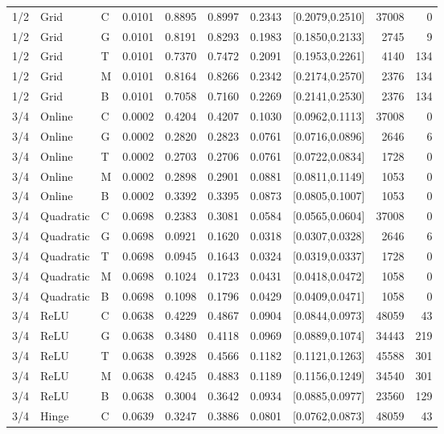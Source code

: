 \begin{longtable}{lllrrrrlrr}
1/2 & Grid & C & 0.0101 & 0.8895 & 0.8997 & 0.2343 & [0.2079,0.2510] & 37008 & 0 \\
1/2 & Grid & G & 0.0101 & 0.8191 & 0.8293 & 0.1983 & [0.1850,0.2133] & 2745 & 9 \\
1/2 & Grid & T & 0.0101 & 0.7370 & 0.7472 & 0.2091 & [0.1953,0.2261] & 4140 & 134 \\
1/2 & Grid & M & 0.0101 & 0.8164 & 0.8266 & 0.2342 & [0.2174,0.2570] & 2376 & 134 \\
1/2 & Grid & B & 0.0101 & 0.7058 & 0.7160 & 0.2269 & [0.2141,0.2530] & 2376 & 134 \\
3/4 & Online & C & 0.0002 & 0.4204 & 0.4207 & 0.1030 & [0.0962,0.1113] & 37008 & 0 \\
3/4 & Online & G & 0.0002 & 0.2820 & 0.2823 & 0.0761 & [0.0716,0.0896] & 2646 & 6 \\
3/4 & Online & T & 0.0002 & 0.2703 & 0.2706 & 0.0761 & [0.0722,0.0834] & 1728 & 0 \\
3/4 & Online & M & 0.0002 & 0.2898 & 0.2901 & 0.0881 & [0.0811,0.1149] & 1053 & 0 \\
3/4 & Online & B & 0.0002 & 0.3392 & 0.3395 & 0.0873 & [0.0805,0.1007] & 1053 & 0 \\
3/4 & Quadratic & C & 0.0698 & 0.2383 & 0.3081 & 0.0584 & [0.0565,0.0604] & 37008 & 0 \\
3/4 & Quadratic & G & 0.0698 & 0.0921 & 0.1620 & 0.0318 & [0.0307,0.0328] & 2646 & 6 \\
3/4 & Quadratic & T & 0.0698 & 0.0945 & 0.1643 & 0.0324 & [0.0319,0.0337] & 1728 & 0 \\
3/4 & Quadratic & M & 0.0698 & 0.1024 & 0.1723 & 0.0431 & [0.0418,0.0472] & 1058 & 0 \\
3/4 & Quadratic & B & 0.0698 & 0.1098 & 0.1796 & 0.0429 & [0.0409,0.0471] & 1058 & 0 \\
3/4 & ReLU & C & 0.0638 & 0.4229 & 0.4867 & 0.0904 & [0.0844,0.0973] & 48059 & 43 \\
3/4 & ReLU & G & 0.0638 & 0.3480 & 0.4118 & 0.0969 & [0.0889,0.1074] & 34443 & 219 \\
3/4 & ReLU & T & 0.0638 & 0.3928 & 0.4566 & 0.1182 & [0.1121,0.1263] & 45588 & 301 \\
3/4 & ReLU & M & 0.0638 & 0.4245 & 0.4883 & 0.1189 & [0.1156,0.1249] & 34540 & 301 \\
3/4 & ReLU & B & 0.0638 & 0.3004 & 0.3642 & 0.0934 & [0.0885,0.0977] & 23560 & 129 \\
3/4 & Hinge & C & 0.0639 & 0.3247 & 0.3886 & 0.0801 & [0.0762,0.0873] & 48059 & 43 \\

\end{longtable}
